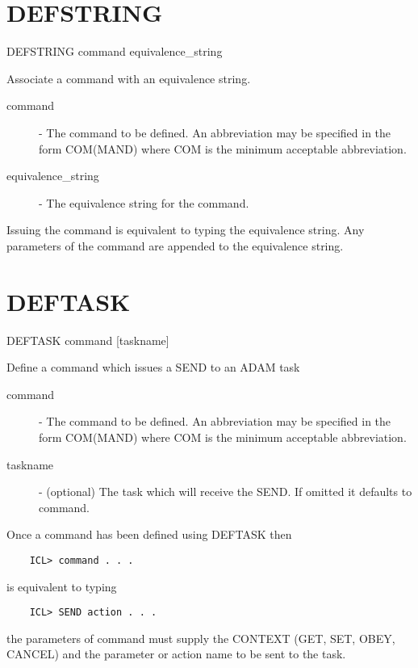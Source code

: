 \documentclass[twoside,11pt]{report}
\newcommand{\xlabel}[1]{}
\begin{document}
\section{\xlabel{DEFSTRING}DEFSTRING\label{DEFSTRING}}

   DEFSTRING \hspace{.5cm} command \hspace{.5cm} equivalence\_string

 Associate a command with an equivalence string.

\begin{description}

\item[command] - The command to be defined. An abbreviation
              may be specified in the form COM(MAND) where
              COM is the minimum acceptable abbreviation.

\item[equivalence\_string] - The equivalence string for the command.

\end{description}
Issuing the command is equivalent to typing the equivalence string. Any
parameters of the command are appended to the equivalence string.

\section{\xlabel{DEFTASK}DEFTASK\label{DEFTASK}}

   DEFTASK \hspace{.5cm} command \hspace{.5cm} [taskname]

 Define a command which issues a SEND to an ADAM task

\begin{description}

\item[command] - The command to be defined. An abbreviation
              may be specified in the form COM(MAND) where
              COM is the minimum acceptable abbreviation.

\item[taskname] - (optional) The task which will receive the SEND.
              If omitted it defaults to command.

\end{description}
Once a command has been defined using DEFTASK then
\begin{verbatim}
    ICL> command . . .
\end{verbatim}
is equivalent to typing 
\begin{verbatim}
    ICL> SEND action . . .
\end{verbatim}
the parameters of command must supply the CONTEXT (GET, SET, OBEY, CANCEL)
and the parameter or action name to be sent to the task.
\end{document}
